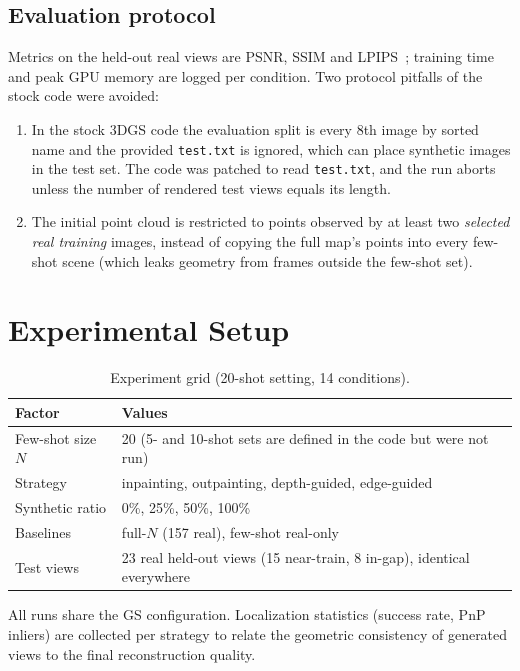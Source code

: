 \documentclass{article}
\begin{document}
\subsection{Evaluation protocol}
\label{sec:protocol}
Metrics on the held-out real views are PSNR, SSIM and LPIPS~\cite{zhang2018lpips}; training time and peak GPU memory are
logged per condition. Two protocol pitfalls of the stock code were avoided:
\begin{enumerate}[noitemsep]
  \item In the stock 3DGS code the evaluation split is every 8th image by sorted name and the provided
        \texttt{test.txt} is ignored, which can place synthetic images in the test set. The code was patched
        to read \texttt{test.txt}, and the run aborts unless the number of rendered test views equals its length.
  \item The initial point cloud is restricted to points observed by at least two \emph{selected real training}
        images, instead of copying the full map's points into every few-shot scene (which leaks geometry from
        frames outside the few-shot set).
\end{enumerate}


\section{Experimental Setup}

\begin{table}[H]
\centering
\caption{Experiment grid (20-shot setting, 14 conditions).}
\begin{tabular}{ll}
\toprule
Factor & Values \\
\midrule
Few-shot size $N$ & 20 (5- and 10-shot sets are defined in the code but were not run) \\
Strategy & inpainting, outpainting, depth-guided, edge-guided \\
Synthetic ratio & 0\%, 25\%, 50\%, 100\% \\
Baselines & full-$N$ (157 real), few-shot real-only \\
Test views & 23 real held-out views (15 near-train, 8 in-gap), identical everywhere \\
\bottomrule
\end{tabular}
\end{table}

All runs share the GS configuration. Localization statistics (success rate, PnP inliers) are collected per
strategy to relate the geometric consistency of generated views to the final reconstruction quality.
\end{document}
